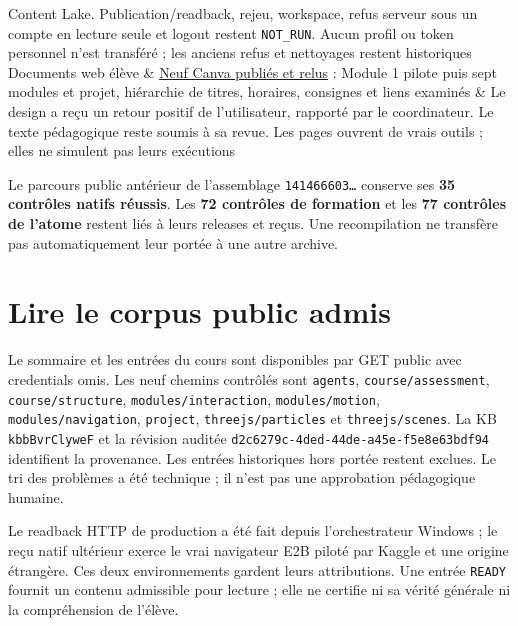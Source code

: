 \documentclass[
  canadien,
  11pt,
  a4paper,
]{report}
\begin{document}
{\begin{longtable}[]
Content Lake. Publication/readback, rejeu, workspace, refus serveur sous
un compte en lecture seule et logout restent \texttt{NOT\_\allowbreak{}RUN}. Aucun
profil ou token personnel n'est transféré ; les anciens refus et
nettoyages restent historiques \\
Documents web élève & \href{../CANVA_DELIVERY.json}{Neuf Canva publiés
et relus} : Module 1 pilote puis sept modules et projet, hiérarchie de
titres, horaires, consignes et liens examinés & Le design a reçu un
retour positif de l'utilisateur, rapporté par le coordinateur. Le texte
pédagogique reste soumis à sa revue. Les pages ouvrent de vrais outils ;
elles ne simulent pas leurs exécutions \\
\end{longtable}
}

Le parcours public antérieur de l'assemblage \texttt{141466603…}
conserve ses \textbf{35 contrôles natifs réussis}. Les \textbf{72
contrôles de formation} et les \textbf{77 contrôles de l'atome} restent
liés à leurs releases et reçus. Une recompilation ne transfère pas
automatiquement leur portée à une autre archive.

\section{Lire le corpus public admis}\label{lire-le-corpus-public-admis}

Le sommaire et les entrées du cours sont disponibles par GET public avec
credentials omis. Les neuf chemins contrôlés sont \texttt{agents},
\texttt{course/\allowbreak{}assessment}, \texttt{course/\allowbreak{}structure},
\texttt{modules/\allowbreak{}interaction}, \texttt{modules/\allowbreak{}motion},
\texttt{modules/\allowbreak{}navigation}, \texttt{project},
\texttt{threejs/\allowbreak{}particles} et \texttt{threejs/\allowbreak{}scenes}. La KB
\texttt{kbb\allowbreak{}Bvr\allowbreak{}Clywe\allowbreak{}F} et la révision auditée
\texttt{d2c6279c-4ded-44de-a45e-f5e8e63bdf94} identifient la provenance.
Les entrées historiques hors portée restent exclues. Le tri des
problèmes a été technique ; il n'est pas une approbation pédagogique
humaine.

Le readback HTTP de production a été fait depuis l'orchestrateur Windows
; le reçu natif ultérieur exerce le vrai navigateur E2B piloté par
Kaggle et une origine étrangère. Ces deux environnements gardent leurs
attributions. Une entrée \texttt{READY} fournit un contenu admissible
pour lecture ; elle ne certifie ni sa vérité générale ni la
compréhension de l'élève.
\end{document}
